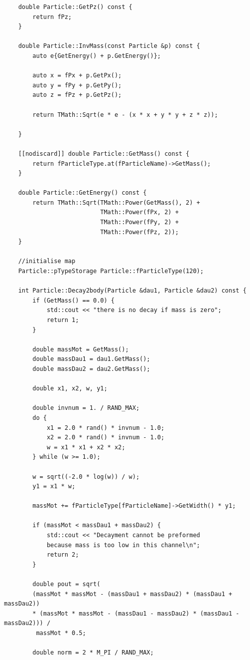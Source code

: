 \documentclass[12pt, a4paper]{article}
\begin{document}
\begin{verbatim}
    double Particle::GetPz() const {
        return fPz;
    }

    double Particle::InvMass(const Particle &p) const {
        auto e{GetEnergy() + p.GetEnergy()};

        auto x = fPx + p.GetPx();
        auto y = fPy + p.GetPy();
        auto z = fPz + p.GetPz();

        return TMath::Sqrt(e * e - (x * x + y * y + z * z));

    }

    [[nodiscard]] double Particle::GetMass() const {
        return fParticleType.at(fParticleName)->GetMass();
    }

    double Particle::GetEnergy() const {
        return TMath::Sqrt(TMath::Power(GetMass(), 2) +
                           TMath::Power(fPx, 2) +
                           TMath::Power(fPy, 2) +
                           TMath::Power(fPz, 2));
    }

    //initialise map
    Particle::pTypeStorage Particle::fParticleType(120);

    int Particle::Decay2body(Particle &dau1, Particle &dau2) const {
        if (GetMass() == 0.0) {
            std::cout << "there is no decay if mass is zero";
            return 1;
        }

        double massMot = GetMass();
        double massDau1 = dau1.GetMass();
        double massDau2 = dau2.GetMass();

        double x1, x2, w, y1;

        double invnum = 1. / RAND_MAX;
        do {
            x1 = 2.0 * rand() * invnum - 1.0;
            x2 = 2.0 * rand() * invnum - 1.0;
            w = x1 * x1 + x2 * x2;
        } while (w >= 1.0);

        w = sqrt((-2.0 * log(w)) / w);
        y1 = x1 * w;

        massMot += fParticleType[fParticleName]->GetWidth() * y1;

        if (massMot < massDau1 + massDau2) {
            std::cout << "Decayment cannot be preformed 
            because mass is too low in this channel\n";
            return 2;
        }

        double pout = sqrt(
        (massMot * massMot - (massDau1 + massDau2) * (massDau1 + massDau2)) 
        * (massMot * massMot - (massDau1 - massDau2) * (massDau1 - massDau2))) /
         massMot * 0.5;

        double norm = 2 * M_PI / RAND_MAX;


\end{verbatim}
\end{document}
